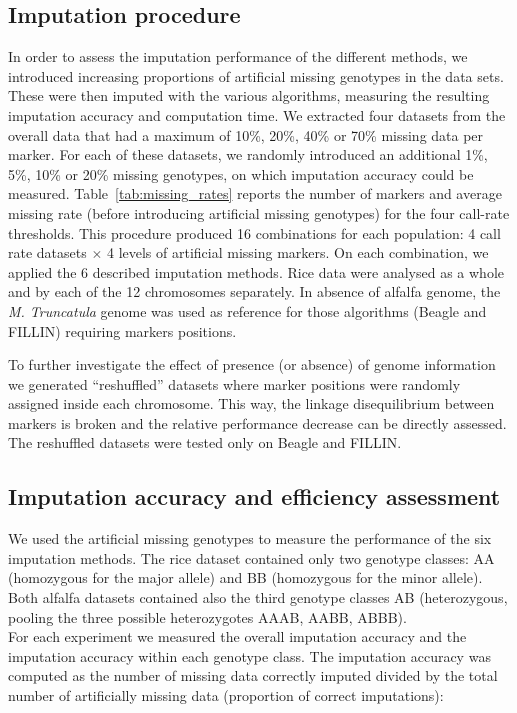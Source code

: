 \subsection{Imputation procedure}
\label{sec:imputation_procedure}
In order to assess the imputation performance of the different methods, we introduced increasing proportions of artificial missing genotypes in the data sets. These were then imputed with the various algorithms, measuring the resulting imputation accuracy and computation time. We extracted four datasets from the overall data that had a maximum of 10\%, 20\%, 40\% or 70\% missing data per marker. For each of these datasets, we randomly introduced an additional 1\%, 5\%, 10\% or 20\% missing genotypes, on which imputation accuracy could be measured. Table~\ref{tab:missing_rates} reports the number of markers and average missing rate (before introducing artificial missing genotypes) for the four call-rate thresholds. This procedure produced 16 combinations for each population: 4 call rate datasets $\times$ 4 levels of artificial missing markers. On each combination, we applied the 6 described imputation methods. Rice data were analysed as a whole and by each of the 12 chromosomes separately. In absence of alfalfa genome, the \emph{M. Truncatula} genome was used as reference for those algorithms (Beagle and FILLIN) requiring markers positions. 

To further investigate the effect of presence (or absence) of genome information we generated ``reshuffled'' datasets where marker positions were randomly assigned inside each chromosome. This way, the linkage disequilibrium between markers is broken and the relative performance decrease can be directly assessed. The reshuffled datasets were tested only on Beagle and FILLIN.  



\subsection{Imputation accuracy and efficiency assessment}
\label{sec:imputation_accuracy_and_efficiency_assessment}
We used the artificial missing genotypes to measure the performance of the six imputation methods. The rice dataset contained only two genotype classes: AA (homozygous for the major allele) and BB (homozygous for the minor allele). Both alfalfa datasets contained also the third genotype classes AB (heterozygous, pooling the three possible heterozygotes AAAB, AABB, ABBB).\\
For each experiment we measured the overall imputation accuracy and the imputation accuracy within each genotype class. The imputation accuracy was computed as the number of missing data correctly imputed divided by the total number of artificially missing data (proportion of correct imputations):

